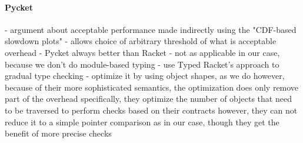 \paragraph{Pycket}
\begin{cnote}
- argument about acceptable performance made indirectly
  using the "CDF-based slowdown plots"
  - allows choice of arbitrary threshold of what is acceptable overhead
    - Pycket always better than Racket
    - not as applicable in our case, because we don't do module-based typing
  - use Typed Racket's approach to gradual type checking
  - optimize it by using object shapes, as we do
    however, because of their more sophisticated semantics,
    the optimization does only remove part of the overhead
    specifically, they optimize the number of objects that need to be traversed
    to perform checks based on their contracts
    however, they can not reduce it to a simple pointer comparison as in our
    case, though they get the benefit of more precise checks
\end{cnote}
